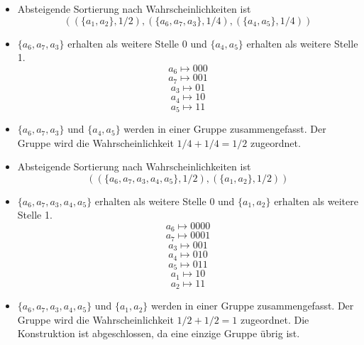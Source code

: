 \begin{itemize}
  \item Absteigende Sortierung nach Wahrscheinlichkeiten ist
  $$((\{a_1, a_2\},1/2),(\{a_6, a_7, a_3\},1/4),(\{a_4,a_5\},1/4))$$
  \item $\{a_6, a_7, a_3\}$ erhalten als weitere Stelle 0 und $\{a_4,a_5\}$ erhalten als weitere Stelle 1.
  $$ a_6 \mapsto 000 $$
  $$ a_7 \mapsto 001 $$
  $$ a_3 \mapsto 01 $$
  $$ a_4 \mapsto 10 $$
  $$ a_5 \mapsto 11 $$
  \item $\{a_6, a_7, a_3\}$ und $\{a_4,a_5\}$ werden in einer Gruppe zusammengefasst. Der Gruppe wird die Wahrscheinlichkeit $1/4 + 1/4 = 1/2$ zugeordnet.
  
  \item Absteigende Sortierung nach Wahrscheinlichkeiten ist
  $$((\{a_6, a_7, a_3, a_4, a_5\},1/2),(\{a_1, a_2\},1/2))$$
  \item $\{a_6, a_7, a_3, a_4, a_5\}$ erhalten als weitere Stelle 0 und $\{a_1, a_2\}$ erhalten als weitere Stelle 1.
  $$ a_6 \mapsto 0000 $$
  $$ a_7 \mapsto 0001 $$
  $$ a_3 \mapsto 001 $$
  $$ a_4 \mapsto 010 $$
  $$ a_5 \mapsto 011 $$
  $$ a_1 \mapsto 10 $$
  $$ a_2 \mapsto 11 $$
  \item $\{a_6, a_7, a_3, a_4, a_5\}$ und $\{a_1, a_2\}$ werden in einer Gruppe zusammengefasst. Der Gruppe wird die Wahrscheinlichkeit $1/2 + 1/2 = 1$ zugeordnet. Die Konstruktion ist abgeschlossen, da eine einzige Gruppe übrig ist.
\end{itemize}

